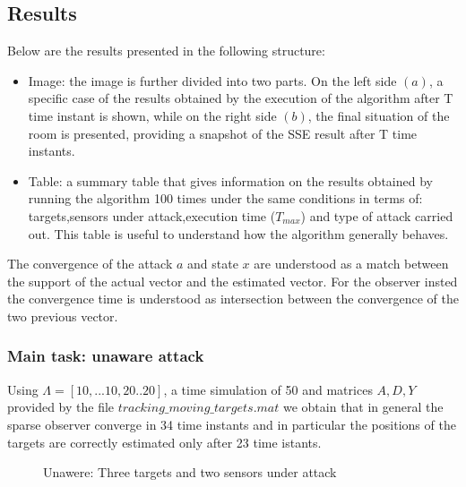    \subsection*{Results}
    Below are the results presented in the following structure:
    \begin{itemize}
        \item Image: the image is further divided into two parts. On the left side $(a)$, a specific case of the results obtained by the execution of the algorithm after T time instant is shown, while on the right side $(b)$, the final situation of the room is presented, providing a snapshot of the SSE result after T time instants.
        \item Table: a summary table that gives information on the results obtained by running the algorithm 100 times under the same conditions in terms of: targets,sensors under attack,execution time ($T_{max}$) and type of attack carried out. This table is useful to understand how the algorithm generally behaves.
    \end{itemize}
\noindent
    The convergence of the attack $a$ and state $x$ are understood as a match between the support of the actual vector and the estimated vector. For the observer insted the convergence time is understood as intersection between the convergence of the two previous vector.
    \subsubsection*{Main task: unaware attack}
    Using $\Lambda = [10,...10,20..20]$, a time simulation of 50 and matrices $A,D,Y$ provided by the file $tracking\_moving\_targets.mat$ we obtain that in general the sparse observer converge in 34 time instants and in particular the positions of the targets are correctly estimated only after 23 time istants.
    \begin{figure}[h]
    \centering
    \caption{Unawere: Three targets and two sensors under attack}
    \end{figure}
    
